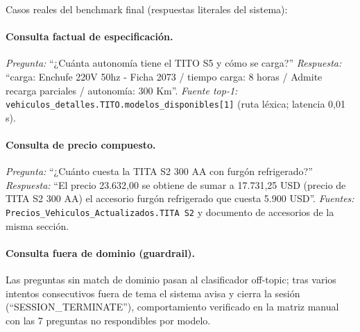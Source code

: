 \documentclass[11pt,a4paper]{article}
\newcommand{\code}[1]{\texttt{#1}}
\begin{document}
Casos reales del benchmark final (respuestas literales del sistema):

\paragraph{Consulta factual de especificación.}
\emph{Pregunta:} ``¿Cuánta autonomía tiene el TITO S5 y cómo se carga?''
\emph{Respuesta:} ``carga: Enchufe 220V 50hz - Ficha 2073 / tiempo carga: 8
horas / Admite recarga parciales / autonomía: 300 Km''.
\emph{Fuente top-1:} \code{vehiculos\_detalles.TITO.modelos\_disponibles[1]}
(ruta léxica; latencia 0{,}01\,s).

\paragraph{Consulta de precio compuesto.}
\emph{Pregunta:} ``¿Cuánto cuesta la TITA S2 300 AA con furgón refrigerado?''
\emph{Respuesta:} ``El precio 23.632,00 se obtiene de sumar a 17.731,25 USD
(precio de TITA S2 300 AA) el accesorio furgón refrigerado que cuesta 5.900
USD''. \emph{Fuentes:} \code{Precios\_Vehiculos\_Actualizados.TITA S2} y
documento de accesorios de la misma sección.

\paragraph{Consulta fuera de dominio (guardrail).}
Las preguntas sin match de dominio pasan al clasificador off-topic; tras
varios intentos consecutivos fuera de tema el sistema avisa y cierra la
sesión (``SESSION\_TERMINATE''), comportamiento verificado en la matriz
manual con las 7 preguntas no respondibles por modelo.
\end{document}
